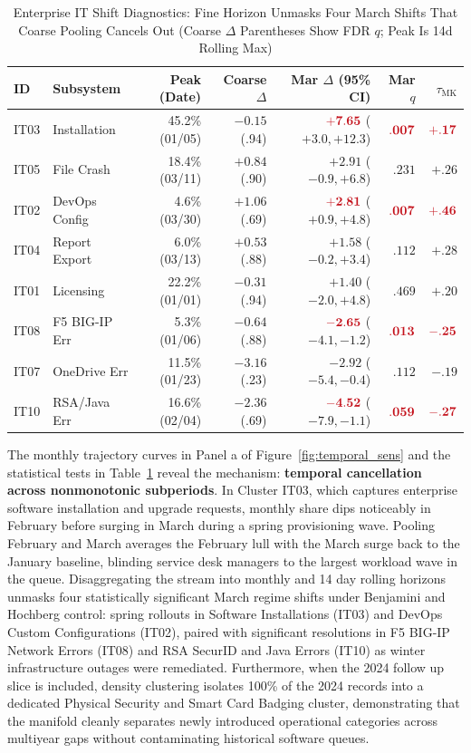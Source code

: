 \documentclass[sigconf,anonymous,pbalance]{acmart}
\newcommand{\hl}[1]{\textcolor{hlred}{\mathbf{#1}}}
\begin{document}
\begin{table}[!htbp]
  \caption{Enterprise IT Shift Diagnostics: Fine Horizon Unmasks Four March Shifts That Coarse Pooling Cancels Out (Coarse $\Delta$ Parentheses Show FDR $q$; Peak Is 14d Rolling Max)}
  \label{tab:exp8}
  \footnotesize
  \setlength{\tabcolsep}{1.2pt}
  \begin{tabular}{llrrrrr}
    \toprule
    ID & Subsystem & Peak (Date) & Coarse $\Delta$ & Mar $\Delta$ (95\% CI) & Mar $q$ & $\tau_{\text{MK}}$ \\
    \midrule
    IT03 & Installation & 45.2\% (01/05) & $-0.15$ (.94) & $\hl{+7.65}$ ($+3.0, +12.3$) & $\hl{.007}$ & $\hl{+.17}$ \\
    IT05 & File Crash & 18.4\% (03/11) & $+0.84$ (.90) & $+2.91$ ($-0.9, +6.8$) & $.231$ & $+.26$ \\
    IT02 & DevOps Config & 4.6\% (03/30) & $+1.06$ (.69) & $\hl{+2.81}$ ($+0.9, +4.8$) & $\hl{.007}$ & $\hl{+.46}$ \\
    IT04 & Report Export & 6.0\% (03/13) & $+0.53$ (.88) & $+1.58$ ($-0.2, +3.4$) & $.112$ & $+.28$ \\
    IT01 & Licensing & 22.2\% (01/01) & $-0.31$ (.94) & $+1.40$ ($-2.0, +4.8$) & $.469$ & $+.20$ \\
    IT08 & F5 BIG-IP Err & 5.3\% (01/06) & $-0.64$ (.88) & $\hl{-2.65}$ ($-4.1, -1.2$) & $\hl{.013}$ & $\hl{-.25}$ \\
    IT07 & OneDrive Err & 11.5\% (01/23) & $-3.16$ (.23) & $-2.92$ ($-5.4, -0.4$) & $.112$ & $-.19$ \\
    IT10 & RSA/Java Err & 16.6\% (02/04) & $-2.36$ (.69) & $\hl{-4.52}$ ($-7.9, -1.1$) & $\hl{.059}$ & $\hl{-.27}$ \\
    \bottomrule
  \end{tabular}
\end{table}

The monthly trajectory curves in Panel a of Figure~\ref{fig:temporal_sens} and the statistical tests in Table~\ref{tab:exp8} reveal the mechanism: \textbf{temporal cancellation across nonmonotonic subperiods}. In Cluster IT03, which captures enterprise software installation and upgrade requests, monthly share dips noticeably in February before surging in March during a spring provisioning wave. Pooling February and March averages the February lull with the March surge back to the January baseline, blinding service desk managers to the largest workload wave in the queue. Disaggregating the stream into monthly and 14 day rolling horizons unmasks four statistically significant March regime shifts under Benjamini and Hochberg control: spring rollouts in Software Installations (IT03) and DevOps Custom Configurations (IT02), paired with significant resolutions in F5 BIG-IP Network Errors (IT08) and RSA SecurID and Java Errors (IT10) as winter infrastructure outages were remediated. Furthermore, when the 2024 follow up slice is included, density clustering isolates 100\% of the 2024 records into a dedicated Physical Security and Smart Card Badging cluster, demonstrating that the manifold cleanly separates newly introduced operational categories across multiyear gaps without contaminating historical software queues.
\end{document}
